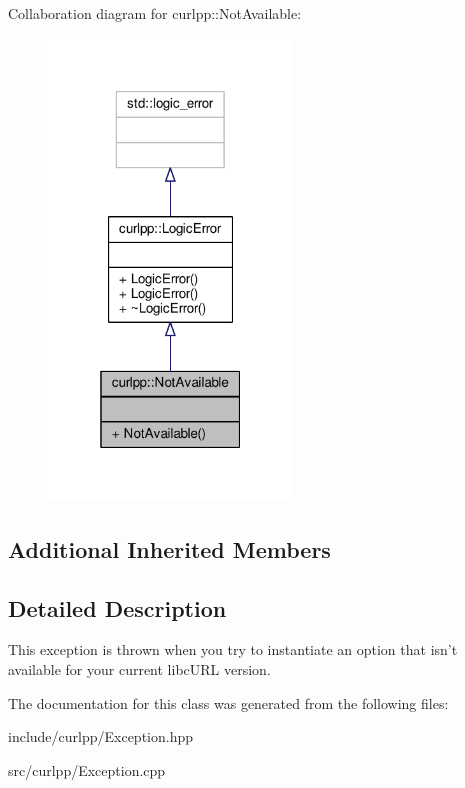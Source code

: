 Collaboration diagram for curlpp\-:\-:Not\-Available\-:
\nopagebreak
\begin{figure}[H]
\begin{center}
\leavevmode
\includegraphics[width=184pt]{classcurlpp_1_1NotAvailable__coll__graph}
\end{center}
\end{figure}
\subsection*{Additional Inherited Members}


\subsection{Detailed Description}
This exception is thrown when you try to instantiate an option that isn't available for your current libc\-U\-R\-L version. 

The documentation for this class was generated from the following files\-:\begin{DoxyCompactItemize}
\item 
include/curlpp/Exception.\-hpp\item 
src/curlpp/Exception.\-cpp\end{DoxyCompactItemize}
